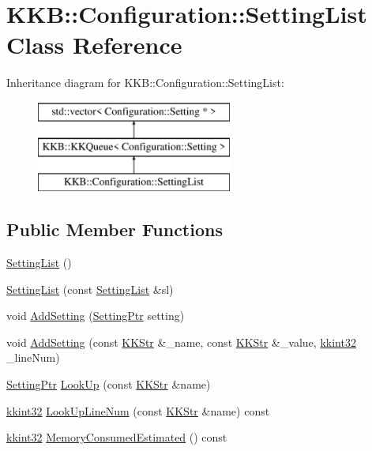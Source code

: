 \hypertarget{class_k_k_b_1_1_configuration_1_1_setting_list}{}\section{K\+KB\+:\+:Configuration\+:\+:Setting\+List Class Reference}
\label{class_k_k_b_1_1_configuration_1_1_setting_list}
Inheritance diagram for K\+KB\+:\+:Configuration\+:\+:Setting\+List\+:\begin{figure}[H]
\begin{center}
\leavevmode
\includegraphics[height=3.000000cm]{class_k_k_b_1_1_configuration_1_1_setting_list}
\end{center}
\end{figure}
\subsection*{Public Member Functions}
\begin{DoxyCompactItemize}
\item 
\hyperlink{class_k_k_b_1_1_configuration_1_1_setting_list_a1e4d4fd83fe6052a545b73d0fe183f84}{Setting\+List} ()
\item 
\hyperlink{class_k_k_b_1_1_configuration_1_1_setting_list_a002b998d758466c4ad5a411dafdb259d}{Setting\+List} (const \hyperlink{class_k_k_b_1_1_configuration_1_1_setting_list}{Setting\+List} \&sl)
\item 
void \hyperlink{class_k_k_b_1_1_configuration_1_1_setting_list_a64c84ce1202ea71852380059c62ea7e0}{Add\+Setting} (\hyperlink{class_k_k_b_1_1_configuration_1_1_setting}{Setting\+Ptr} setting)
\item 
void \hyperlink{class_k_k_b_1_1_configuration_1_1_setting_list_a38f52dd5637e88cb3f56369d0459eba6}{Add\+Setting} (const \hyperlink{class_k_k_b_1_1_k_k_str}{K\+K\+Str} \&\+\_\+name, const \hyperlink{class_k_k_b_1_1_k_k_str}{K\+K\+Str} \&\+\_\+value, \hyperlink{namespace_k_k_b_a8fa4952cc84fda1de4bec1fbdd8d5b1b}{kkint32} \+\_\+line\+Num)
\item 
\hyperlink{class_k_k_b_1_1_configuration_1_1_setting}{Setting\+Ptr} \hyperlink{class_k_k_b_1_1_configuration_1_1_setting_list_aa0955610ab4272330018b07a3cfef2eb}{Look\+Up} (const \hyperlink{class_k_k_b_1_1_k_k_str}{K\+K\+Str} \&name)
\item 
\hyperlink{namespace_k_k_b_a8fa4952cc84fda1de4bec1fbdd8d5b1b}{kkint32} \hyperlink{class_k_k_b_1_1_configuration_1_1_setting_list_af00887798da2cedefc20b9a4b3bd4623}{Look\+Up\+Line\+Num} (const \hyperlink{class_k_k_b_1_1_k_k_str}{K\+K\+Str} \&name) const 
\item 
\hyperlink{namespace_k_k_b_a8fa4952cc84fda1de4bec1fbdd8d5b1b}{kkint32} \hyperlink{class_k_k_b_1_1_configuration_1_1_setting_list_a5ba2ef9e87c503455d8d3b259289129b}{Memory\+Consumed\+Estimated} () const 
\end{DoxyCompactItemize}
